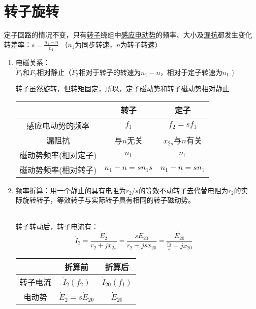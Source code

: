\documentclass[blue]{elegantnote}
\begin{document}
\section{转子旋转}
定子回路的情况不变，{\color{thid}只有\underline{转子}绕组中\underline{感应电动势}的频率、大小及\underline{漏抗}都发生变化}
\\  转差率：$s=\frac{n_1-n}{n_1}$ （$n_1$为同步转速，$n$为转子转速） \\
\begin{enumerate}
	\item 电磁关系：
	\\$\dot F_1$和$\dot F_2$相对静止（$\dot F_2$相对于转子的转速为$n_1-n$，相对于定子转速为$n_1$ )\\
	\begin{note}
		转子虽然旋转，但转矩固定，所以，定子磁动势和转子磁动势相对静止
	\end{note}
	\begin{table}[h]
		\centering
		\begin{tabular}{|c|c|c|}
			\hline
			\phantom{转子}  & 转子  & 定子  \\ \hline
			感应电动势的频率   &  $f_1$   &  $f_2=sf_1$   \\ \hline
			漏阻抗           &    与$n$无关   & $x_{2s}$与$n$有关  \\ \hline
			磁动势频率(相对定子)   &     $n_1$   &    $n_1$   \\ \hline
			磁动势频率({\color{blue}相对转子})   &  $n_1-n=sn_1s$      &    $n_1-n=sn_1$   \\ \hline
		\end{tabular}
	\end{table}
	\item 频率折算：{\color{thid}用一个静止的具有电阻为$r_2/s$的等效不动转子去代替电阻为$r_2$的实际旋转转子，等效转子与实际转子具有相同的转子磁动势。}
	\begin{newproof}
		\\转子转动后，转子电流有：
		$$\dot I_2=\frac{\dot E_2}{r_2+jx_{2s}}=\frac{s\dot{E_{20}}}{r_2+jsx_{20}}=
		\frac{\dot{E_{20}}}{\frac{r_2}{s}+jx_{20}}$$
	\end{newproof}
	\begin{table}[!h]
		\centering
		\begin{tabular}{|c|c|c|}
			\hline 
			\phantom{折算前} &折算前 &折算后  \\ \hline
			转子电流  &  $\dot I_2(f_2)$   &  $\dot I_{20}(f_1)$  \\ \hline
			电动势   &  $\dot E_2=s\dot E_{20}$   &    $\dot E_{20}$  \\  \hline

\end{tabular}
\end{table}
\end{enumerate}
\end{document}
